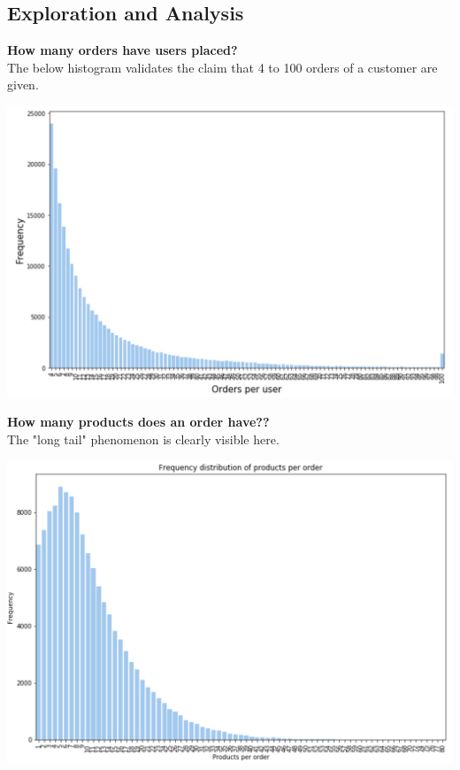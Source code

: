 \documentclass[12pt]{article}
\begin{document}
\subsection{Exploration and Analysis}

\noindent
\textbf{How many orders have users placed?} \\
The below histogram validates the claim that 4 to 100 orders of a customer are given.
\begin{center}
	\includegraphics[scale=0.2]{order_user}
\end{center}


\noindent
\textbf{How many products does an order have??} \\
The "long tail" phenomenon is clearly visible here.
\begin{center}
	\includegraphics[scale=0.2]{train_products_order}
\end{center} 
\end{document}
